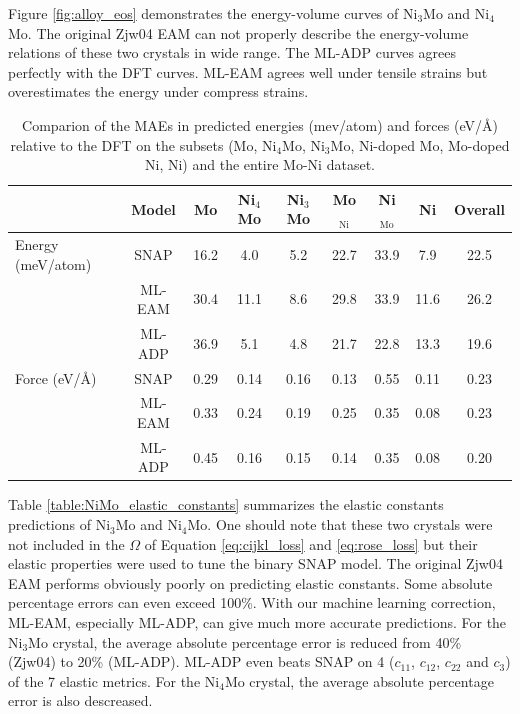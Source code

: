 \documentclass[final,3p,times]{elsarticle}
\begin{document}
Figure \ref{fig:alloy_eos} demonstrates the energy-volume curves of Ni$_3$Mo and
Ni$_4$Mo. The original Zjw04 EAM can not properly describe the energy-volume 
relations of these two crystals in wide range. The ML-ADP curves agrees 
perfectly with the DFT curves. ML-EAM agrees well under tensile strains but 
overestimates the energy under compress strains. 

% 
%
\begin{table}
\centering
\begin{tabular}{lcccccccc}
\hline
                  & Model            & Mo   & Ni$_4$Mo & Ni$_3$Mo & Mo$_{\mathrm{Ni}}$ & Ni$_{\mathrm{Mo}}$ & Ni   & Overall \\
\hline
Energy (meV/atom) & SNAP \cite{SNAP} & 16.2 & 4.0      & 5.2      & 22.7               & 33.9               & 7.9  & 22.5    \\
                  & ML-EAM           & 30.4 & 11.1     & 8.6      & 29.8               & 33.9               & 11.6 & 26.2    \\
                  & ML-ADP           & 36.9 & 5.1      & 4.8      & 21.7               & 22.8               & 13.3 & 19.6    \\
\hline
Force (eV/\AA)    & SNAP \cite{SNAP} & 0.29 & 0.14     & 0.16     & 0.13               & 0.55               & 0.11 & 0.23    \\
                  & ML-EAM           & 0.33 & 0.24     & 0.19     & 0.25               & 0.35               & 0.08 & 0.23    \\
                  & ML-ADP           & 0.45 & 0.16     & 0.15     & 0.14               & 0.35               & 0.08 & 0.20    \\
\hline
\end{tabular}
\caption{\label{table:MAE}
Comparion of the MAEs in predicted energies (mev/atom) and forces (eV/\AA) 
relative to the DFT on the subsets (Mo, Ni$_4$Mo, Ni$_3$Mo, Ni-doped Mo, 
Mo-doped Ni, Ni) and the entire Mo-Ni dataset.}
\end{table}

Table \ref{table:NiMo_elastic_constants} summarizes the elastic constants 
predictions of Ni$_3$Mo and Ni$_4$Mo. One should note that these two crystals 
were not included in the $\Omega$ of Equation \ref{eq:cijkl_loss} and 
\ref{eq:rose_loss} but their elastic properties were used to tune the binary 
SNAP model. The original Zjw04 EAM performs obviously poorly on predicting 
elastic constants. Some absolute percentage errors can even exceed 100\%. With 
our machine learning correction, ML-EAM, especially ML-ADP, can give much more  
accurate predictions. For the Ni$_3$Mo crystal, the average absolute percentage 
error is reduced from 40\% (Zjw04) to 20\% (ML-ADP). ML-ADP even beats SNAP on 4 
($c_{11}$, $c_{12}$, $c_{22}$ and $c_{3}$) of the 7 elastic metrics. For the 
Ni$_4$Mo crystal, the average absolute percentage error is also descreased. 
\end{document}
